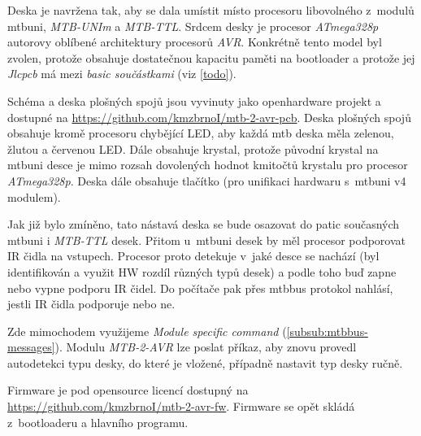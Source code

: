 Deska je navržena tak, aby se dala umístit místo procesoru libovolného z~modulů
\gls{mtbuni}, \textit{MTB-UNIm} a \textit{MTB-TTL}. Srdcem desky je procesor
\textit{ATmega328p} autorovy oblíbené architektury procesorů \textit{AVR}.
Konkrétně tento model byl zvolen, protože obsahuje dostatečnou kapacitu paměti
na bootloader a protože jej \textit{Jlcpcb} má mezi \textit{basic součástkami}
(viz \ref{todo}).

Schéma a deska plošných spojů jsou vyvinuty jako openhardware projekt a dostupné
na \url{https://github.com/kmzbrnoI/mtb-2-avr-pcb}. Deska plošných spojů obsahuje
kromě procesoru chybějící LED, aby každá \gls{mtb} deska měla zelenou, žlutou a
červenou LED. Dále obsahuje krystal, protože původní krystal na \gls{mtbuni}
desce je mimo rozsah dovolených hodnot kmitočtů krystalu pro procesor
\textit{ATmega328p}. Deska dále obsahuje tlačítko (pro unifikaci hardwaru
s~\gls{mtbuni} v4 modulem).

Jak již bylo zmíněno, tato nástavá deska se bude osazovat do patic současných
\gls{mtbuni} i \textit{MTB-TTL} desek. Přitom u~\gls{mtbuni} desek by měl procesor
podporovat IR čidla na vstupech. Procesor proto detekuje v~jaké desce se nachází
(byl identifikován a využit HW rozdíl různých typů desek) a podle toho buď
zapne nebo vypne podporu IR čidel. Do počítače pak přes \gls{mtbbus} protokol
nahlásí, jestli IR čidla podporuje nebo ne.

Zde mimochodem využijeme \textit{Module specific command} (\ref{subsub:mtbbus-messages}). Modulu
\textit{MTB-2-AVR} lze poslat příkaz, aby znovu provedl autodetekci typu
desky, do které je vložené, případně nastavit typ desky ručně.

Firmware je pod opensource licencí dostupný na
\url{https://github.com/kmzbrnoI/mtb-2-avr-fw}. Firmware se opět skládá
z~bootloaderu a hlavního programu.
